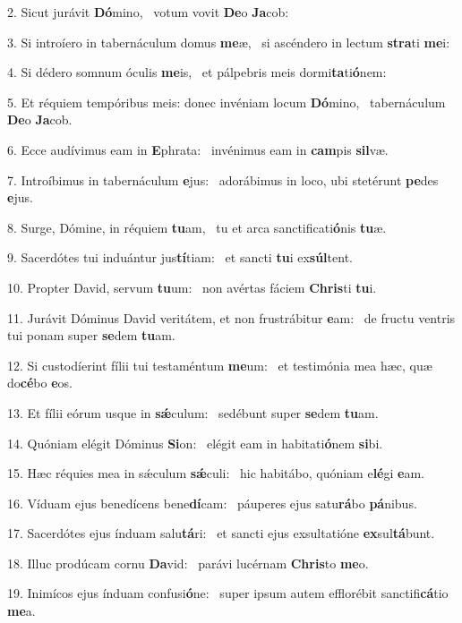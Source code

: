 2. Sicut jurávit \textbf{Dó}mino, \ast\  votum vovit \textbf{De}o \textbf{Ja}cob:\

3. Si introíero in tabernáculum domus \textbf{me}æ, \ast\  si ascéndero in lectum \textbf{stra}ti \textbf{me}i:\

4. Si dédero somnum óculis \textbf{me}is, \ast\  et pálpebris meis dormi\textbf{ta}ti\textbf{ó}nem:\

5. Et réquiem tempóribus meis: donec invéniam locum \textbf{Dó}mino, \ast\  tabernáculum \textbf{De}o \textbf{Ja}cob.\

6. Ecce audívimus eam in \textbf{E}phrata: \ast\  invénimus eam in \textbf{cam}pis \textbf{sil}væ.\

7. Introíbimus in tabernáculum \textbf{e}jus: \ast\  adorábimus in loco, ubi stetérunt \textbf{pe}des \textbf{e}jus.\

8. Surge, Dómine, in réquiem \textbf{tu}am, \ast\  tu et arca sanctificati\textbf{ó}nis \textbf{tu}æ.\

9. Sacerdótes tui induántur jus\textbf{tí}tiam: \ast\  et sancti \textbf{tu}i ex\textbf{súl}tent.\

10. Propter David, servum \textbf{tu}um: \ast\  non avértas fáciem \textbf{Chris}ti \textbf{tu}i.\

11. Jurávit Dóminus David veritátem, et non frustrábitur \textbf{e}am: \ast\  de fructu ventris tui ponam super \textbf{se}dem \textbf{tu}am.\

12. Si custodíerint fílii tui testaméntum \textbf{me}um: \ast\  et testimónia mea hæc, quæ do\textbf{cé}bo \textbf{e}os.\

13. Et fílii eórum usque in \textbf{sǽ}culum: \ast\  sedébunt super \textbf{se}dem \textbf{tu}am.\

14. Quóniam elégit Dóminus \textbf{Si}on: \ast\  elégit eam in habitati\textbf{ó}nem \textbf{si}bi.\

15. Hæc réquies mea in sǽculum \textbf{sǽ}culi: \ast\  hic habitábo, quóniam e\textbf{lé}gi \textbf{e}am.\

16. Víduam ejus benedícens bene\textbf{dí}cam: \ast\  páuperes ejus satu\textbf{rá}bo \textbf{pá}nibus.\

17. Sacerdótes ejus índuam salu\textbf{tá}ri: \ast\  et sancti ejus exsultatióne \textbf{ex}sul\textbf{tá}bunt.\

18. Illuc prodúcam cornu \textbf{Da}vid: \ast\  parávi lucérnam \textbf{Chris}to \textbf{me}o.\

19. Inimícos ejus índuam confusi\textbf{ó}ne: \ast\  super ipsum autem efflorébit sanctifi\textbf{cá}tio \textbf{me}a.\

